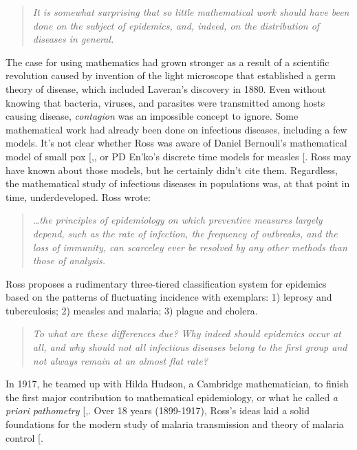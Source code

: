 \documentclass[
]{book}
\begin{document}
\begin{quote}
\emph{It is somewhat surprising that so little mathematical work should have been done on the subject of epidemics, and, indeed, on the distribution of diseases in general.}
\end{quote}

The case for using mathematics had grown stronger as a result of a scientific revolution caused by invention of the light microscope that established a germ theory of disease, which included Laveran's discovery in 1880. Even without knowing that bacteria, viruses, and parasites were transmitted among hosts causing disease, \emph{contagion} was an impossible concept to ignore. Some mathematical work had already been done on infectious diseases, including a few models. It's not clear whether Ross was aware of Daniel Bernouli's mathematical model of small pox {[},\citeproc{ref-BacaerN2011DanielBernoulli}{46}{]}, or PD En'ko's discrete time models for measles {[}\citeproc{ref-DietzK1988FirstEpidemic}{47}{]}.
Ross may have known about those models, but he certainly didn't cite them.
Regardless, the mathematical study of infectious diseases in populations was, at that point in time, underdeveloped.
Ross wrote:

\begin{quote}
\emph{\ldots the principles of epidemiology on which preventive measures largely depend, such as the rate of infection, the frequency of outbreaks, and the loss of immunity, can scarceley ever be resolved by any other methods than those of analysis.}
\end{quote}

Ross proposes a rudimentary three-tiered classification system for epidemics based on the patterns of fluctuating incidence with exemplars: 1) leprosy and tuberculosis; 2) measles and malaria; 3) plague and cholera.

\begin{quote}
\emph{To what are these differences due? Why indeed should epidemics occur at all, and why should not all infectious diseases belong to the first group and not always remain at an almost flat rate?}
\end{quote}

In 1917, he teamed up with Hilda Hudson, a Cambridge mathematician, to finish the first major contribution to mathematical epidemiology, or what he called \emph{a priori pathometry} {[},\citeproc{ref-RossR1917AprioriPathometry3}{49}{]}.
Over 18 years (1899-1917), Ross's ideas laid a solid foundations for the modern study of malaria transmission and theory of malaria control {[}\citeproc{ref-SmithDL2012_RossMacdonald}{2}{]}.
\end{document}

